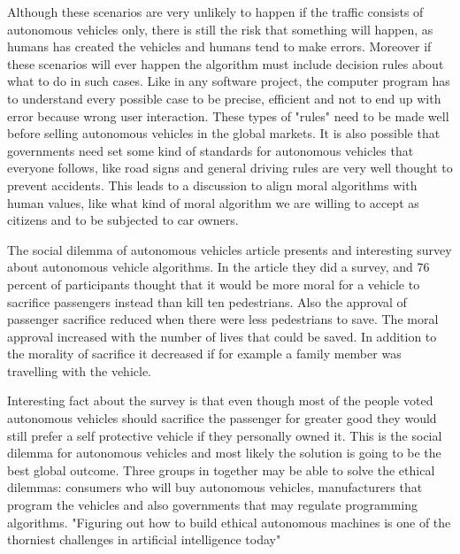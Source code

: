 \documentclass[english]{tktltiki}
\begin{document}
Although these scenarios are very unlikely to happen if the traffic consists of 
autonomous vehicles only, there is still the risk that something will happen, as 
humans has created the vehicles and humans tend to make errors. Moreover if 
these scenarios will ever happen the algorithm must include decision rules about 
what to do in such cases. \cite{dilemma} Like in any software project, the 
computer program has to understand every possible case to be precise, efficient 
and not to end up with error because wrong user interaction. These types of 
"rules" need to be made well before selling autonomous vehicles in the global 
markets. It is also possible that governments need set some kind of standards 
for autonomous vehicles that everyone follows, like road signs and general 
driving  rules are very well thought to prevent accidents. This leads to a 
discussion to align moral algorithms with human values, like what kind of moral 
algorithm we are willing to accept as citizens and to be subjected to car 
owners. 

The social dilemma of autonomous vehicles article presents and interesting 
survey about autonomous vehicle algorithms. In the article they did a survey, 
and 76 percent of participants thought that it would be more moral for a vehicle 
to sacrifice passengers instead than kill ten pedestrians. \cite{dilemma} Also 
the approval of passenger sacrifice reduced when there were less pedestrians to 
save. The moral approval increased with the number of lives that could be saved. 
In addition to the morality of sacrifice it decreased if for example a family 
member was travelling with the vehicle.

Interesting fact about the survey is that even though most of the people voted 
autonomous vehicles should sacrifice the passenger for greater good they would 
still prefer a self protective vehicle if they personally owned it. 
\cite{dilemma} This is the social dilemma for autonomous vehicles and most 
likely the solution is going to be the best global outcome. Three groups in 
together may be able to solve the ethical dilemmas: \cite{differences} consumers who will buy 
autonomous vehicles, manufacturers that program the vehicles and also 
governments that may regulate programming algorithms. "Figuring out how to build 
ethical autonomous machines is one of the thorniest challenges in artificial 
intelligence today"
\end{document}
